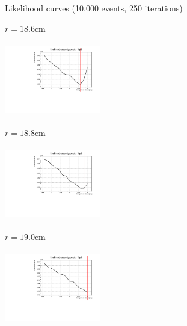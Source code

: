\documentclass[handout,8 pt]{beamer}
\begin{document}
\begin{frame}{Likelihood curves (10.000 events, 250 iterations)}
\vspace{-5pt}
\begin{minipage}[c]{.32\textwidth}
\begin{exampleblock}{} \begin{center}$r = 18.6$cm\end{center} \end{exampleblock}
\includegraphics[width=4.2cm, height=3.2cm]{figs/likelihood250LowStat/likelihood18p6.pdf} 
\end{minipage}
\begin{minipage}[c]{.32\textwidth}
\begin{exampleblock}{} \begin{center}$r = 18.8$cm\end{center} \end{exampleblock}
\includegraphics[width=4.2cm, height=3.2cm]{figs/likelihood250LowStat/likelihood18p8.pdf} 
\end{minipage}
\begin{minipage}[c]{.32\textwidth}
\begin{exampleblock}{} \begin{center}$r = 19.0$cm\end{center} \end{exampleblock}
\includegraphics[width=4.2cm, height=3.2cm]{figs/likelihood250LowStat/likelihood19p0.pdf} 
\end{minipage}
\end{frame}
\end{document}
